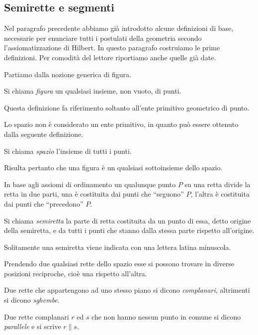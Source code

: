 \subsection{Semirette e segmenti}

Nel paragrafo precedente abbiamo già introdotto alcune definizioni di 
base, necessarie per enunciare tutti i postulati della geometria 
secondo l'assiomatizzazione di Hilbert. In questo paragrafo 
costruiamo le prime definizioni. Per comodità del lettore riportiamo 
anche quelle già date.

Partiamo dalla nozione generica di figura.
\begin{definizione}
Si chiama \emph{figura} un qualsiasi insieme, non vuoto, di punti.
\end{definizione}
Questa definizione fa riferimento soltanto all'ente primitivo 
geometrico di punto.

Lo spazio non è considerato un ente primitivo, in quanto può essere 
ottenuto dalla seguente definizione.
\begin{definizione}
Si chiama \emph{spazio} l'insieme di tutti i punti.
\end{definizione}
Risulta pertanto che una figura è un qualsiasi sottoinsieme dello 
spazio.

In base agli assiomi di ordinamento un qualunque punto \(P\) su una 
retta divide la retta in due parti, una è costituita dai punti che 
``seguono'' \(P\), l'altra è costituita dai punti che ``precedono'' \(P\).
\begin{definizione}
Si chiama \emph{semiretta} la parte di retta costituita da un punto 
di essa, detto origine della semiretta, e da tutti i punti che stanno 
dalla stessa parte rispetto all'origine.
\end{definizione}
Solitamente una semiretta viene indicata con una lettera latina 
minuscola.

Prendendo due qualsiasi rette dello spazio esse si possono trovare in 
diverse posizioni reciproche, cioè una rispetto all'altra.
\begin{definizione}
Due rette che appartengono ad uno stesso piano si dicono 
\emph{complanari}, altrimenti si dicono \emph{sghembe}.
\end{definizione}

\begin{definizione}
Due rette complanari \(r\) ed \(s\) che non hanno nessun punto in comune 
si dicono \emph{parallele} e si scrive \(r\parallel s\).
\end{definizione}


